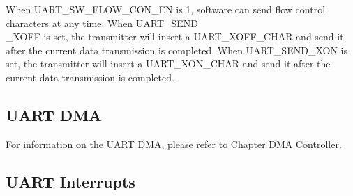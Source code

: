 \documentclass[main\_\_EN.tex]{subfiles}
\begin{document}
When UART\_SW\_FLOW\_CON\_EN is 1, software can send flow control characters at any time. When UART\_SEND\\\_XOFF is set, the transmitter will insert a UART\_XOFF\_CHAR and send it after the current data transmission is completed. When UART\_SEND\_XON is set, the transmitter will insert a UART\_XON\_CHAR and send it after the current data transmission is completed.

\subsection{UART DMA}

For information on the UART DMA, please refer to Chapter \hyperref[mod:dma]{DMA Controller}.

\subsection{UART Interrupts}
\end{document}

